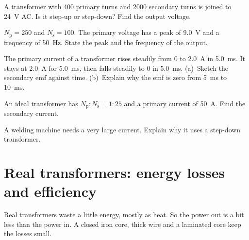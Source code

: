 \enlargethispage{\baselineskip}
\begin{quickcheck}
  \item A transformer with 400 primary turns and 2000 secondary turns is joined to
        \qty{24}{V} AC. Is it step-up or step-down? Find the output voltage.
  \item $N_\mathrm{p} = 250$ and $N_\mathrm{s} = 100$. The primary voltage has a peak of
        \qty{9.0}{V} and a frequency of \qty{50}{Hz}. State the peak and the frequency of
        the output.
  \item The primary current of a transformer rises steadily from 0 to \qty{2.0}{A} in
        \qty{5.0}{ms}. It stays at \qty{2.0}{A} for \qty{5.0}{ms}, then falls steadily to 0
        in \qty{5.0}{ms}. (a)~Sketch the secondary emf against time. (b)~Explain why the
        emf is zero from \qty{5}{ms} to \qty{10}{ms}.\label{ch4:qc:ramp}
  \item An ideal transformer has $N_\mathrm{p} : N_\mathrm{s} = 1 : 25$ and a primary
        current of \qty{50}{A}. Find the secondary current.
  \item A welding machine needs a very large current. Explain why it uses a step-down
        transformer.
\end{quickcheck}

\section{Real transformers: energy losses and efficiency}\label{ch4:sec:losses}

\begin{bigidea}
Real transformers waste a little energy, mostly as heat. So the power out is a bit less
than the power in. A closed iron core, thick wire and a laminated core keep the losses
small.
\end{bigidea}

\begin{keywords}
\end{keywords}

